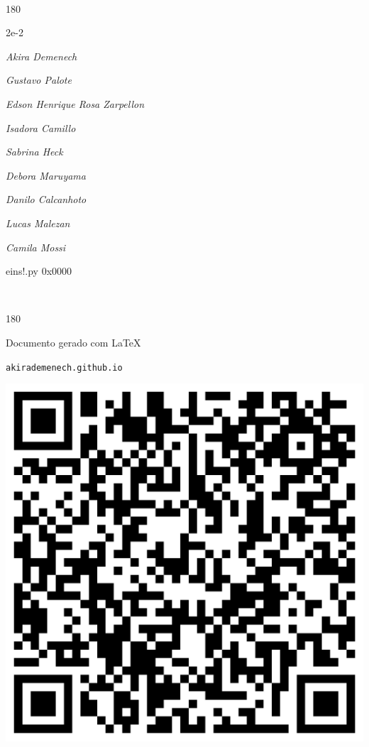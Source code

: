 \documentclass[12pt]{article}
\begin{document}
		  

\pagebreak			

	\ 
	\vfill
	\begin{turn}{180}	
		\begin{minipage}{\textwidth}
		  	\ttfamily %
			\centering
			{\Huge 2e-2}
		  
			\hfill
		  
			

\textit{\small Akira Demenech}

\textit{\small Gustavo Palote}

\textit{\small Edson Henrique Rosa Zarpellon}

\textit{\small Isadora Camillo}

\textit{\small Sabrina Heck}

\textit{\small Debora Maruyama}

\textit{\small Danilo Calcanhoto}

\textit{\small Lucas Malezan}

\textit{\small Camila Mossi}

\bigskip

eins!.py
0x0000


		\end{minipage}	
	\end{turn}
	\vfill
	\

\pagebreak

	\begin{turn}{180}	
		\begin{minipage}{\textwidth}		  
		  Documento gerado com \LaTeX			
		  
		  \texttt{akirademenech.github.io}

		  \includegraphics[height=0.3\textheight]{2e-2.pdf}

		\end{minipage}	
	\end{turn}  
		  
\end{document}
